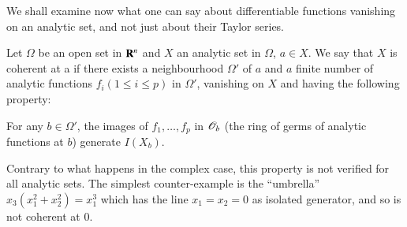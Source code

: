 We shall examine now what one can say about differentiable functions vanishing on an analytic set, and not just about their Taylor series.

\begin{definition}\label{chap6-defi3.9}
Let $\Omega$ be an open set in $\mathbf{R}^{n}$ and $X$ an analytic set in $\Omega$, $a\in X$. We say that $X$ is coherent at a if there exists a neighbourhood $\Omega'$ of $a$ and $a$ finite number of analytic functions $f_{i}(1\leq i\leq p)$ in $\Omega'$, vanishing on $X$ and having the following property:

For any $b\in\Omega'$, the images of $f_{1},\ldots,f_{p}$ in $\mathscr{O}_{b}$ (the ring of germs of analytic functions at $b$) generate $I(X_{b})$.
\end{definition}

Contrary to what happens in the complex case, this property is not verified for all analytic sets. The simplest counter-example is the ``umbrella'' $x_{3}(x^{2}_{1}+x^{2}_{2})=x^{3}_{1}$ which has the line $x_{1}=x_{2}=0$ as isolated generator, and so is not coherent at $0$.

\begin{theorem}\label{chap6-thm3.10}
\end{theorem}

